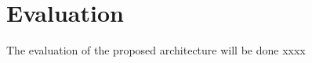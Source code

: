 \section{Evaluation}
\label{sec:Evaluation}

The evaluation of the proposed architecture will be done xxxx